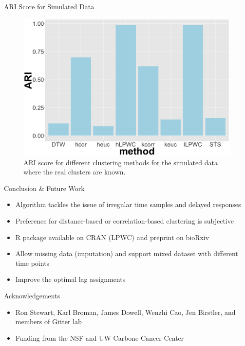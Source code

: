 \documentclass[10pt]{beamer}
\begin{document}
\begin{frame}{ARI Score for Simulated Data}
\begin{figure}
     \includegraphics[width=0.7\linewidth]{ARI-Impulse.png}
      \caption{ARI score for different clustering methods for the simulated data where the real clusters are known.}
       \label{fig:ariscore}
    \end{figure}

\end{frame}


\begin{frame}{Conclusion \& Future Work}
\begin{itemize}
\item Algorithm tackles the issue of irregular time samples and delayed responses
\item Preference for distance-based or correlation-based clustering is subjective
\item R package available on CRAN (LPWC) and preprint on bioRxiv
\item Allow missing data (imputation) and support mixed dataset with different time points
\item Improve the optimal lag assignments
\end{itemize}
\end{frame}


\begin{frame}{Acknowledgements}

\begin{itemize}
\item Ron Stewart, Karl Broman, James Dowell, Wenzhi Cao, Jen Birstler, and members of Gitter lab
\item Funding from the NSF and UW Carbone Cancer Center
\end{itemize}

\end{frame}



\end{document}
